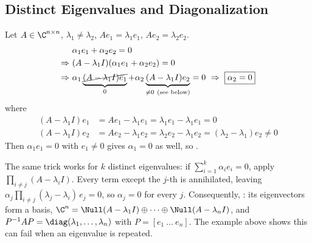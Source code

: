 \subsection{Distinct Eigenvalues and Diagonalization}\label{ss:diagonalization}
Let $A\in\C^{n\times n}$, $\lambda_1\neq\lambda_2$, $Ae_1=\lambda_1e_1$, $Ae_2=\lambda_2e_2$.
\begin{align*}
&\alpha_1e_1+\alpha_2e_2=0\\
\Rightarrow\ &(A-\lambda_1I)(\alpha_1e_1+\alpha_2e_2)=0\\
\Rightarrow\ &\alpha_1\underbrace{\cancel{(A-\lambda_1I)e_1}}_{0}+\alpha_2\underbrace{(A-\lambda_1I)e_2}_{\neq0\ \text{(see below)}}=0\ \Rightarrow\ \boxed{\alpha_2=0}
\end{align*}
where
\begin{align*}
(A-\lambda_1I)e_1&=Ae_1-\lambda_1e_1=\lambda_1e_1-\lambda_1e_1=0\\
(A-\lambda_1I)e_2&=Ae_2-\lambda_1e_2=\lambda_2e_2-\lambda_1e_2=(\lambda_2-\lambda_1)e_2\neq0
\end{align*}
Then $\alpha_1e_1=0$ with $e_1\neq0$ gives $\alpha_1=0$ as well, so .

\begin{insight}
The same trick works for $k$ distinct eigenvalues: if $\sum_{i=1}^k\alpha_ie_i=0$, apply $\prod_{i\neq j}(A-\lambda_iI)$. Every term except the $j$-th is annihilated, leaving $\alpha_j\prod_{i\neq j}(\lambda_j-\lambda_i)\,e_j=0$, so $\alpha_j=0$ for every $j$. Consequently, : its eigenvectors form a basis, $\C^n=\Null(A-\lambda_1I)\oplus\dots\oplus\Null(A-\lambda_nI)$, and $P^{-1}AP=\diag(\lambda_1,\dots,\lambda_n)$ with $P=[e_1\ \dots\ e_n]$. The example above shows this can fail when an eigenvalue is repeated.
\end{insight}
